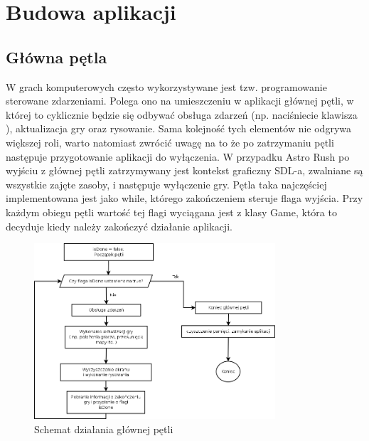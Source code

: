 \chapter{Budowa aplikacji} 

\section{Główna pętla}

W grach komputerowych często wykorzystywane jest tzw. programowanie sterowane zdarzeniami. Polega ono na umieszczeniu w aplikacji głównej pętli, w której to cyklicznie będzie się odbywać obsługa zdarzeń (np. naciśniecie klawisza ), aktualizacja gry oraz rysowanie. Sama kolejność tych elementów nie odgrywa większej roli, warto natomiast zwrócić uwagę na to że po zatrzymaniu pętli następuje przygotowanie aplikacji do wyłączenia. W przypadku Astro Rush po wyjściu z głównej pętli zatrzymywany jest kontekst graficzny SDL-a, zwalniane są wszystkie zajęte zasoby, i następuje wyłączenie gry. Pętla taka najczęściej implementowana jest jako while, którego zakończeniem steruje flaga wyjścia. Przy każdym obiegu pętli wartość tej flagi wyciągana jest z klasy Game, która to decyduje kiedy należy zakończyć działanie aplikacji. 

\begin{figure}[h]
    \centering
    \includegraphics[width=0.8\textwidth,natwidth=410,natheight=142]{./Pictures/main_loop.png}
    \caption{Schemat działania głównej pętli}
\end{figure}

